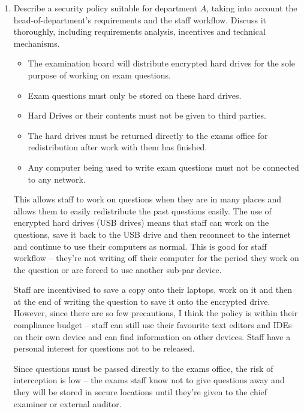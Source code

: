 \documentclass[10pt,\jkfside,a4paper]{article}
\begin{document}
\begin{enumerate}
\begin{enumerate}
\begin{enumerate}[label=(\roman*)]
\end{enumerate}

\item Describe a security policy suitable for department $A$, taking into
account the head-of-department's requirements and the staff workflow.
Discuss it thoroughly, including requirements analysis, incentives and
technical mechanisms.

\begin{itemize}

\item The examination board will distribute encrypted hard drives for the sole
purpose of working on exam questions.

\item Exam questions must only be stored on these hard drives.

\item Hard Drives or their contents must not be given to third parties.

\item The hard drives must be returned directly to the exams office for
redistribution after work with them has finished.

\item Any computer being used to write exam questions must not be connected
to any network.

\end{itemize}

This allows staff to work on questions when they are in many places and allows them
to easily redistribute the past questions easily. The use of encrypted hard drives
(USB drives) means that staff can work on the questions, save it back to the USB drive
and then reconnect to the internet and continue to use their computers as normal. This
is good for staff workflow -- they're not writing off their computer for the period they work
on the question or are forced to use another sub-par device.

Staff are incentivised to save a copy onto their laptops, work on it and
then at the end of writing the question to save it onto the encrypted drive.
However, since there are so few precautions, I think the policy is within their compliance
budget -- staff can still use their favourite text editors and IDEs on their own device and
can find information on other devices. Staff have a personal interest for questions not
to be released.

Since questions must be passed directly to the exams office, the risk of interception
is low -- the exams staff know not to give questions away and they will be stored in
secure locations until they're given to the chief examiner or external auditor.


\end{enumerate}
\end{enumerate}
\end{document}
